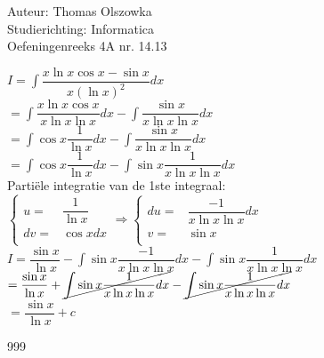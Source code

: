 \documentclass[a4paper]{article}
\newcommand{\dint}{\displaystyle\int}
\begin{document}
\noindent \large Auteur: Thomas Olszowka \\
\noindent \large Studierichting: Informatica \\
\noindent \large Oefeningenreeks 4A nr. 14.13  \\



\medskip

\normalsize

$I = \dint \dfrac{x \ln x \cos x - \sin x}{x(\ln x)^2} dx$ \\

$= \dint \dfrac{x \ln x \cos x }{x \ln x \ln x} dx - \dint \dfrac{\sin x }{x \ln x \ln x} dx$ \\

$= \dint \cos x \dfrac{1}{\ln x} dx - \dint \dfrac{\sin x}{x \ln x \ln x} dx$ \\

$= \dint \cos x \dfrac{1}{\ln x} dx - \dint \sin x \dfrac{1}{x \ln x \ln x} dx$ \\

Partiële integratie van de 1ste integraal:
$\left\{\begin{array}{cc}
    u =& \dfrac{1}{\ln x} \\ 
    dv =& \cos x dx \\ 
\end{array}\right. \Rightarrow\left\{\begin{array}{cc}
    du =& \dfrac{-1}{x \ln x \ln x} dx \\
    v =& \sin x \\
\end{array}\right.$ \\

$I = \dfrac{\sin x}{\ln x} - \dint \sin x \dfrac{-1}{x \ln x \ln x} dx - \dint \sin x \dfrac{1}{x \ln x \ln x} dx $ \\

$= \dfrac{\sin x}{\ln x} + \cancel{\dint \sin x \dfrac{1}{x \ln x \ln x} dx} - \cancel{\dint \sin x \dfrac{1}{x \ln x \ln x} dx} $ \\

$= \dfrac{\sin x}{\ln x} + c$ \\

\begin{thebibliography}{999}
\end{thebibliography}
\end{document}
